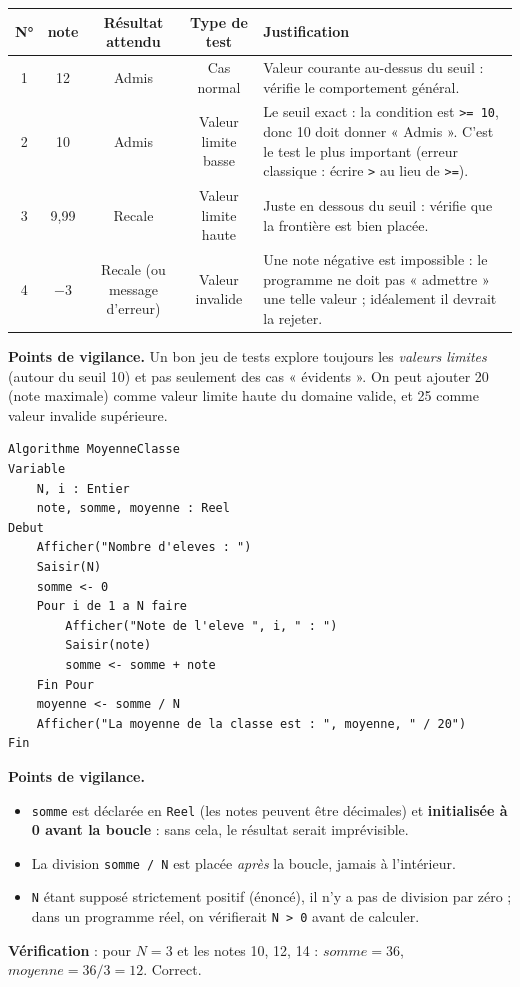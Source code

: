 \documentclass[11pt]{article}
\begin{document}
\begin{corrige}
\begin{center}
\begin{tabularx}{\linewidth}{|c|c|c|c|X|}
\hline
\rowcolor{popblueL}\textbf{N°} & \textbf{note} & \textbf{Résultat attendu} & \textbf{Type de test} & \textbf{Justification} \\
\hline
1 & 12 & Admis & Cas normal & Valeur courante au-dessus du seuil : vérifie le comportement général. \\
\hline
2 & 10 & Admis & Valeur limite basse & Le seuil exact : la condition est \texttt{>= 10}, donc 10 doit donner « Admis ». C'est le test le plus important (erreur classique : écrire \texttt{>} au lieu de \texttt{>=}). \\
\hline
3 & 9,99 & Recale & Valeur limite haute & Juste en dessous du seuil : vérifie que la frontière est bien placée. \\
\hline
4 & $-3$ & Recale (ou message d'erreur) & Valeur invalide & Une note négative est impossible : le programme ne doit pas « admettre » une telle valeur ; idéalement il devrait la rejeter. \\
\hline
\end{tabularx}
\end{center}
\textbf{Points de vigilance.} Un bon jeu de tests explore toujours les \emph{valeurs limites} (autour du seuil 10) et pas seulement des cas « évidents ». On peut ajouter 20 (note maximale) comme valeur limite haute du domaine valide, et 25 comme valeur invalide supérieure.
\end{corrige}

\begin{corrige}
\begin{lstlisting}
Algorithme MoyenneClasse
Variable
    N, i : Entier
    note, somme, moyenne : Reel
Debut
    Afficher("Nombre d'eleves : ")
    Saisir(N)
    somme <- 0
    Pour i de 1 a N faire
        Afficher("Note de l'eleve ", i, " : ")
        Saisir(note)
        somme <- somme + note
    Fin Pour
    moyenne <- somme / N
    Afficher("La moyenne de la classe est : ", moyenne, " / 20")
Fin
\end{lstlisting}
\textbf{Points de vigilance.}
\begin{itemize}
    \item \texttt{somme} est déclarée en \texttt{Reel} (les notes peuvent être décimales) et \textbf{initialisée à 0 avant la boucle} : sans cela, le résultat serait imprévisible.
    \item La division \texttt{somme / N} est placée \emph{après} la boucle, jamais à l'intérieur.
    \item \texttt{N} étant supposé strictement positif (énoncé), il n'y a pas de division par zéro ; dans un programme réel, on vérifierait \texttt{N > 0} avant de calculer.
\end{itemize}
\textbf{Vérification} : pour $N = 3$ et les notes 10, 12, 14 : $somme = 36$, $moyenne = 36 / 3 = 12$. Correct.
\end{corrige}
\end{document}
